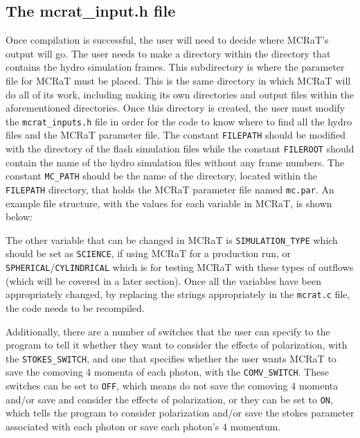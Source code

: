 \documentclass[12pt,a4paper]{article}
\begin{document}
\subsection{The mcrat\_input.h file}
Once compilation is successful, the user will need to decide where MCRaT's output will go. The user needs to make a directory within the directory that contains the hydro simulation frames. This subdirectory is where the parameter file for MCRaT must be placed. This is the same directory in which MCRaT will do all of its work, including making its own directories and output files within the aforementioned directories. Once this directory is created, the user must modify the \texttt{mcrat\_inputs.h} file in order for the code to know where to find all the hydro files and the MCRaT parameter file. The constant \texttt{FILEPATH} should be modified with the directory of the flash simulation files while the constant \texttt{FILEROOT} should contain the name of the hydro simulation files without any frame numbers. The constant \texttt{MC\_PATH} should be the name of the directory, located within the \texttt{FILEPATH} directory, that holds the MCRaT parameter file named \texttt{mc.par}. An example file structure, with the values for each variable in MCRaT, is shown below: \\
\begin{figure}[h!]
\end{figure}

The other variable that can be changed in MCRaT is \texttt{SIMULATION\_TYPE} which should be set as \texttt{SCIENCE}, if using MCRaT for a production run, or \texttt{SPHERICAL}/\texttt{CYLINDRICAL} which is for testing MCRaT with these types of outflows (which will be covered in a later section). Once all the variables have been appropriately changed, by replacing the strings appropriately in the \texttt{mcrat.c} file, the code needs to be recompiled.

Additionally, there are a number of switches that the user can specify to the program to tell it whether they want to consider the effects of polarization, with the \texttt{STOKES\_SWITCH}, and one that specifies whether the user wants MCRaT to save the comoving 4 momenta of each photon, with the \texttt{COMV\_SWITCH}. These switches can be set to \texttt{OFF}, which means do not save the comoving 4 momenta and/or save and consider the effects of polarization, or they can be set to \texttt{ON}, which tells the program to consider polarization and/or save the stokes parameter associated with each photon or save each photon's 4 momentum.
\end{document}
